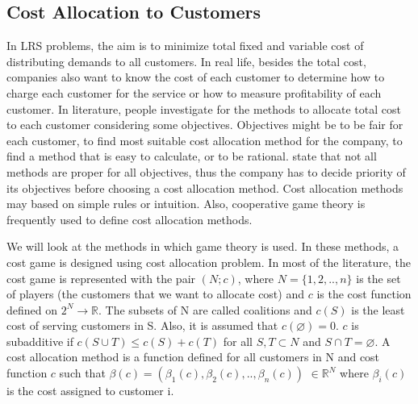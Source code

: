 \subsection {Cost Allocation to Customers} 
In LRS problems, the aim is to minimize total fixed and variable cost of distributing 
demands to all customers. In real life, besides the total cost, companies also want to 
know the cost of each customer to determine how to charge each customer for the service 
or how to measure profitability of each customer. In literature, people 
investigate for the methods to allocate total cost to each customer considering some
objectives. Objectives might be to be fair for each customer, to find most suitable
cost allocation method for the company, to find a method that is easy to calculate, 
or to be rational. \citet{Tijs} state that not all methods are proper for 
all objectives, thus the company has to decide priority of its objectives before 
choosing a cost allocation method. Cost allocation methods may based on simple
rules or intuition. Also, cooperative game theory is frequently used to define 
cost allocation methods.

We will look at the methods in which game theory is used. In these methods,
a cost game is designed using cost allocation problem. In most of the literature,
the cost game is represented with the pair $(N;c)$, where $N=\{1,2,..,n\}$ is 
the set of players (the customers that we want to allocate cost) and $c$ is the cost 
function defined on $2^N \to \mathbb{R}$. The subsets of N are called coalitions 
and $c(S)$ is the least cost of serving customers in S. Also, it is assumed that 
$c(\varnothing)=0$. $c$ is subadditive if $c(S \cup T) \leq c(S)+c(T)$ for all
$S, T \subset N$ and $S \cap T = \varnothing$. A cost allocation method is a 
function defined for all customers in N and cost function $c$ such that 
$\beta(c)=(\beta_1(c),\beta_2(c),..,\beta_n(c))$ $\in \mathbb{R}^N$ where
$\beta_i(c)$ is the cost assigned to customer i. 


